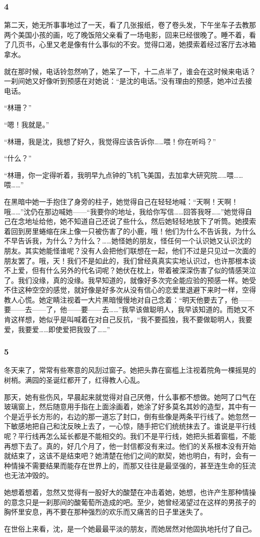 \subsubsection*{4}
\par 第二天，她无所事事地过了一天，看了几张报纸，卷了卷头发，下午坐车子去教那两个美国小孩的画，吃了晚饭陪父亲看了一场电影，回来已经很晚了。睡不着，看了几页书，心里又老是像有什么事似的不安。觉得口渴，她摸索着经过客厅去冰箱拿水。
\par 就在那时候，电话铃忽然响了，她呆了一下，十二点半了，谁会在这时候来电话？一刹间她又好像听到预感在对她说：“是沈的电话。”没有理由的预感，她冲过去接电话。
\par “林珊？”
\par “嗯！我就是。”
\par “林珊，我是沈，我想了好久，我觉得应该告诉你……喂！你在听吗？”
\par “什么？”
\par “林珊，你一定得听着，我明早九点钟的飞机飞美国，去加拿大研究院……喂……喂……”
\par 在黑暗中她一手抱住了身旁的柱子，她觉得自己在轻轻地喊：“天啊！天啊！哦……”沈仍在那边喊她——“我要你的地址，我给你写信……回答我呀……”她觉得自己在念地址给他，她不知道自己还说了些什么，然后她轻轻地放下了听筒。她摸索着回到房里蜷缩在床上像一只被伤害了的小鹿，哦！他们为什么不告诉我，为什么不早告诉我，为什么？为什么？……她怪她的朋友，怪任何一个认识她又认识沈的朋友。其实她能怪谁呢？没有人会把他们联想在一起，他们不过是只见过一次面的朋友罢了。哦，天！我们不是如此的，我们曾经真真实实地认识过，也许那根本谈不上爱，但有什么另外的代名词呢？她伏在枕上，带着被深深伤害了似的情感哭泣了。我们没缘，真的没缘。我早知道的，就像好多次完全能应验的预感一样。她受不住这种空空的感觉，就好像是好多次从没有信心的恋爱里退避下来时一样，空得教人心慌。她定睛注视着一大片黑暗慢慢地对自己念着：“明天他要去了，他——要——去——了，他——要——去……”我早该做聪明人，我早该知道的。而她又不肯这样想，她似乎是叫喊着在对自己反抗，“我不要孤独，我不要做聪明人，我要爱，我要爱……即使爱把我毁了……”
\subsubsection*{5}
\par 冬天来了，常常有些寒意的风刮过窗子。她把头靠在窗槛上注视着院角一棵摇晃的树梢。满园的圣诞红都开了，红得教人心乱。
\par 那天，她有些伤风，早晨起来就觉得对自己厌倦，什么事都不想做。她呵了口气在玻璃窗上，然后随意用手指在上面涂画着，她涂了好多莫名其妙的造型，其中有一个是近乎长方形的，右边的那一道忘了封口，倒有些像是两条平行线了。她忽然一下敏感地把自己和沈反映上去了，一心惊，随手把它们统统抹去了。谁说是平行线呢？平行线再怎么延长都是不能相交的。我们不是平行线，她把头抵着窗槛，不能再想下去了。真的，好几个月了，他一封信都没有来过。他们的关系根本没有开始就结束了，这该不是结束吧？她清楚在他们之间的默契，她也明白，有时，会有一种情操不需要结果而能存在世界上的，而那又往往是最坚强的，甚至连生命的狂流也无法冲毁的。
\par 她想着想着，忽然又觉得有一股好大的酸楚在冲击着她，她想，也许产生那种情操的意念只是一刹那间的酸葡萄所造成的吧。至少，她曾经渴望过在这样的男孩子的胸怀里安息，再不要在那种强烈的欢乐而又痛苦的日子里迷失了。
\par 在世俗上来看，沈，是一个她最最平淡的朋友，而她居然对他固执地托付了自己。
